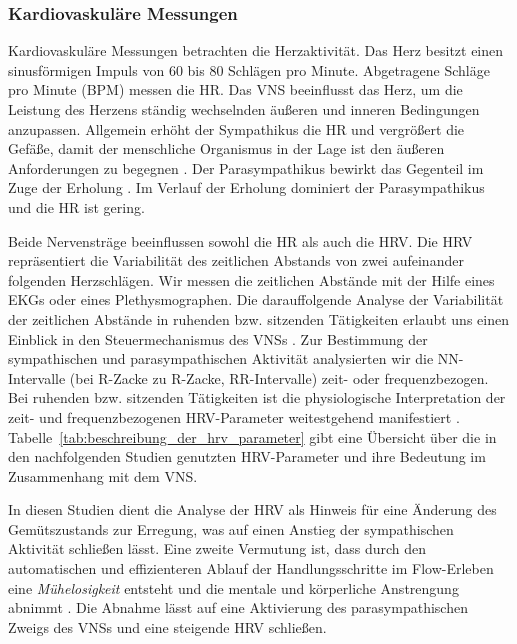 \subsubsection{Kardiovaskuläre Messungen} 

\label{ssub:kardiovaskulare_messungen}

Kardiovaskuläre Messungen betrachten die Herzaktivität. Das Herz besitzt einen sinusförmigen Impuls von 60 bis 80 Schlägen pro Minute. Abgetragene Schläge pro Minute (\ac{BPM}) messen die HR. Das \acs{VNS} beeinflusst das Herz, um die Leistung des Herzens ständig wechselnden äußeren und inneren Bedingungen anzupassen. Allgemein erhöht der Sympathikus die HR und vergrößert die Gefäße, damit der menschliche Organismus in der Lage ist den äußeren Anforderungen zu begegnen \citep[][S.~226]{Porges1995}. Der Parasympathikus bewirkt das Gegenteil im Zuge der Erholung \citep[][S.~226]{Porges1995}. Im Verlauf der Erholung dominiert der Parasympathikus und die HR ist gering. 

Beide Nervensträge beeinflussen sowohl die HR als auch die \ac{HRV}. Die \ac{HRV} repräsentiert die Variabilität des zeitlichen Abstands von zwei aufeinander folgenden Herzschlägen. Wir messen die zeitlichen Abstände mit der Hilfe eines \ac{EKG}s oder eines Plethysmographen. Die darauffolgende Analyse der Variabilität der zeitlichen Abstände in ruhenden bzw. sitzenden Tätigkeiten erlaubt uns einen Einblick in den Steuermechanismus des \acs{VNS}s \citep{Jalife1983}. Zur Bestimmung der sympathischen und parasympathischen Aktivität analysierten wir die NN-Intervalle (bei R-Zacke zu R-Zacke, RR-Intervalle) zeit- oder frequenzbezogen. Bei ruhenden bzw. sitzenden Tätigkeiten ist die physiologische Interpretation der zeit- und frequenzbezogenen \ac{HRV}-Parameter weitestgehend manifestiert \citep[][S.~360]{TaskForce1996}. Tabelle~\ref{tab:beschreibung_der_hrv_parameter} gibt eine Übersicht über die in den nachfolgenden Studien genutzten \ac{HRV}-Parameter und ihre Bedeutung im Zusammenhang mit dem \acs{VNS}. 

In diesen Studien dient die Analyse der \ac{HRV} als Hinweis für eine Änderung des Gemütszustands zur Erregung, was auf einen Anstieg der sympathischen Aktivität schließen lässt. Eine zweite Vermutung ist, dass durch den automatischen und effizienteren Ablauf der Handlungsschritte im Flow-Erleben eine \emph{Mühelosigkeit} entsteht und die mentale und körperliche Anstrengung abnimmt \citep[][S.~308]{deManzano2010}. Die Abnahme lässt auf eine Aktivierung des parasympathischen Zweigs des \acs{VNS}s und eine steigende \ac{HRV} schließen. 

